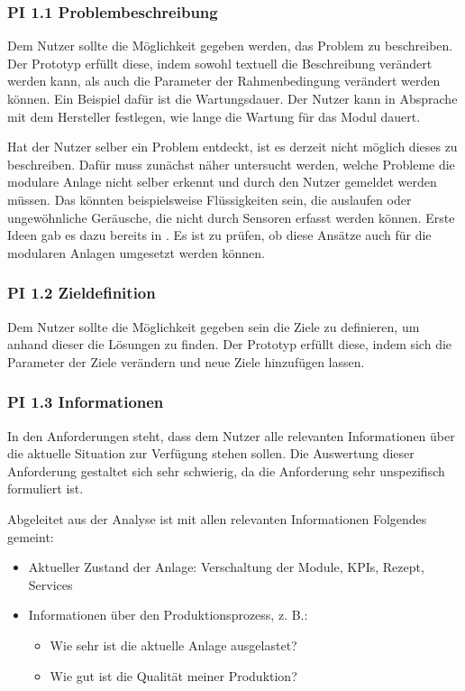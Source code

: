 \subsubsection*{PI 1.1 Problembeschreibung}
Dem Nutzer sollte die Möglichkeit gegeben werden, das Problem zu beschreiben. Der Prototyp erfüllt diese, indem sowohl textuell die Beschreibung verändert werden kann, als auch die Parameter der Rahmenbedingung verändert werden können. Ein Beispiel dafür ist die Wartungsdauer. Der Nutzer kann in Absprache mit dem Hersteller festlegen, wie lange die Wartung für das Modul dauert.

Hat der Nutzer selber ein Problem entdeckt, ist es derzeit nicht möglich dieses zu beschreiben. Dafür muss zunächst näher untersucht werden, welche Probleme die modulare Anlage nicht selber erkennt und durch den Nutzer gemeldet werden müssen. Das könnten beispielsweise Flüssigkeiten sein, die auslaufen oder ungewöhnliche Geräusche, die nicht durch Sensoren erfasst werden können. Erste Ideen gab es dazu bereits in \cite{Bieber2018}. Es ist zu prüfen, ob diese Ansätze auch für die modularen Anlagen umgesetzt werden können.

\subsubsection*{PI 1.2 Zieldefinition}
Dem Nutzer sollte die Möglichkeit gegeben sein die Ziele zu definieren, um anhand dieser die Lösungen zu finden. Der Prototyp erfüllt diese, indem sich die Parameter der Ziele verändern und neue Ziele hinzufügen lassen.

\subsubsection*{PI 1.3 Informationen}
In den Anforderungen steht, dass dem Nutzer alle relevanten Informationen über die aktuelle Situation zur Verfügung stehen sollen. Die Auswertung dieser Anforderung gestaltet sich sehr schwierig, da die Anforderung sehr unspezifisch formuliert ist.

Abgeleitet aus der Analyse ist mit allen relevanten Informationen Folgendes gemeint:
\begin{itemize}
\item Aktueller Zustand der Anlage: Verschaltung der Module, KPIs, Rezept, Services
\item Informationen über den Produktionsprozess, z. B.:
	\begin{itemize}
	\item Wie sehr ist die aktuelle Anlage ausgelastet?
	\item Wie gut ist die Qualität meiner Produktion?
\end{itemize}
\end{itemize}

